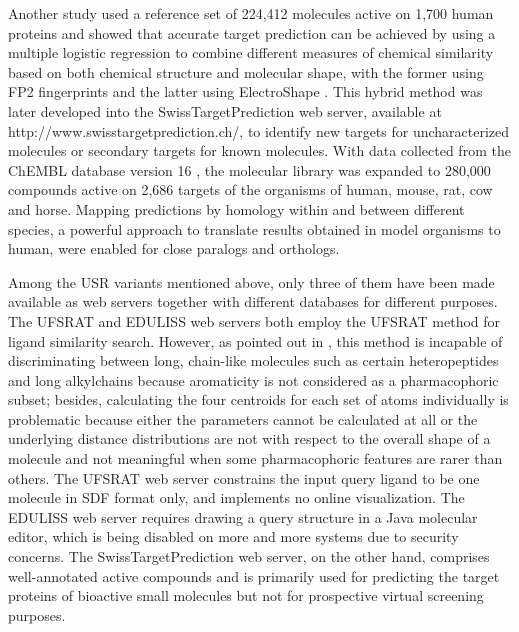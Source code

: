 Another study \citep{1407} used a reference set of 224,412 molecules active on 1,700 human proteins and showed that accurate target prediction can be achieved by using a multiple logistic regression to combine different measures of chemical similarity based on both chemical structure and molecular shape, with the former using FP2 fingerprints and the latter using ElectroShape \citep{1338}. This hybrid method was later developed into the SwissTargetPrediction \citep{1408} web server, available at http://www.swisstargetprediction.ch/, to identify new targets for uncharacterized molecules or secondary targets for known molecules. With data collected from the ChEMBL database version 16 \citep{1441}, the molecular library was expanded to 280,000 compounds active on 2,686 targets of the organisms of human, mouse, rat, cow and horse. Mapping predictions by homology within and between different species, a powerful approach to translate results obtained in model organisms to human, were enabled for close paralogs and orthologs.

Among the USR variants mentioned above, only three of them \citep{1436,1437,1408} have been made available as web servers together with different databases for different purposes. The UFSRAT \citep{1436} and EDULISS \citep{1437} web servers both employ the UFSRAT \citep{1436} method for ligand similarity search. However, as pointed out in \citep{1331}, this method is incapable of discriminating between long, chain-like molecules such as certain heteropeptides and long alkylchains because aromaticity is not considered as a pharmacophoric subset; besides, calculating the four centroids for each set of atoms individually is problematic because either the parameters cannot be calculated at all or the underlying distance distributions are not with respect to the overall shape of a molecule and not meaningful when some pharmacophoric features are rarer than others. The UFSRAT \citep{1436} web server constrains the input query ligand to be one molecule in SDF format only, and implements no online visualization. The EDULISS \citep{1437} web server requires drawing a query structure in a Java molecular editor, which is being disabled on more and more systems due to security concerns. The SwissTargetPrediction \citep{1408} web server, on the other hand, comprises well-annotated active compounds and is primarily used for predicting the target proteins of bioactive small molecules but not for prospective virtual screening purposes.

